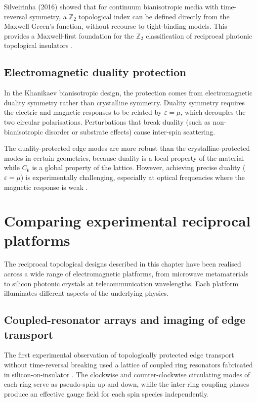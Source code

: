 Silveirinha (2016) showed that for continuum bianisotropic media with
time-reversal symmetry, a $\mathbb{Z}_2$ topological index can be
defined directly from the Maxwell Green's function, without
recourse to tight-binding models.  This provides a Maxwell-first
foundation for the $\mathbb{Z}_2$ classification of reciprocal
photonic topological insulators \cite{mario2016microsoft,
unknown2015phys}.

\subsection{Electromagnetic duality protection}
\label{sec:ch11-duality}

In the Khanikaev bianisotropic design, the protection comes from
electromagnetic duality symmetry rather than crystalline symmetry.
Duality symmetry requires the electric and magnetic responses to be
related by $\varepsilon=\mu$, which decouples the two circular
polarisations.  Perturbations that break duality (such as
non-bianisotropic disorder or substrate effects) cause inter-spin
scattering.

The duality-protected edge modes are more robust than the
crystalline-protected modes in certain geometries, because duality
is a local property of the material while $C_6$ is a global property
of the lattice.  However, achieving precise duality
($\varepsilon=\mu$) is experimentally challenging, especially at
optical frequencies where the magnetic response is weak
\cite{bliokh2015quantum,ozawa2018topological}.

\section{Comparing experimental reciprocal platforms}
\label{sec:ch11-experimental-platforms}

The reciprocal topological designs described in this chapter have been
realised across a wide range of electromagnetic platforms, from
microwave metamaterials to silicon photonic crystals at
telecommunication wavelengths.  Each platform illuminates different
aspects of the underlying physics.

\subsection{Coupled-resonator arrays and imaging of edge transport}
\label{sec:ch11-coupled-resonator-exp}

The first experimental observation of topologically protected edge
transport without time-reversal breaking used a lattice of coupled
ring resonators fabricated in silicon-on-insulator
\cite{hafezi2013imaging}.  The clockwise and counter-clockwise
circulating modes of each ring serve as pseudo-spin up and down,
while the inter-ring coupling phases produce an effective gauge field
for each spin species independently.


